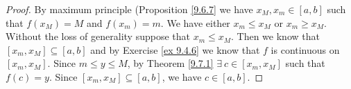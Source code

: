 \begin{proof}
    By maximum principle (Proposition \ref{9.6.7} we have \(x_M, x_m \in [a, b]\) such that \(f(x_M) = M\) and \(f(x_m) = m\).
    We have either \(x_m \leq x_M\) or \(x_m \geq x_M\).
    Without the loss of generality suppose that \(x_m \leq x_M\).
    Then we know that \([x_m, x_M] \subseteq [a, b]\) and by Exercise \ref{ex 9.4.6} we know that \(f\) is continuous on \([x_m, x_M]\).
    Since \(m \leq y \leq M\), by Theorem \ref{9.7.1} \(\exists\ c \in [x_m, x_M]\) such that \(f(c) = y\).
    Since \([x_m, x_M] \subseteq [a, b]\), we have \(c \in [a, b]\).
\end{proof}